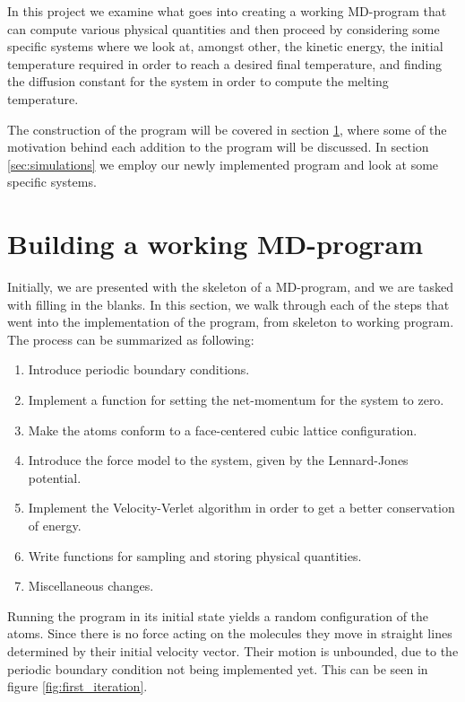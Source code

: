\documentclass[a4paper]{article}
\begin{document}
    In this project we examine what goes into creating a working MD-program
    that can compute various physical quantities and then proceed by
    considering some specific systems where we look at, amongst other, the
    kinetic energy, the initial temperature required in order to reach a
    desired final temperature, and finding the diffusion constant for the
    system in order to compute the melting temperature.

    The construction of the program will be covered in section
    \ref{sec:building_a_working_md_program}, where some of the motivation
    behind each addition to the program will be discussed. In section
    \ref{sec:simulations} we employ our newly implemented program and look at
    some specific systems.

\section{Building a working MD-program}
\label{sec:building_a_working_md_program}
    
    Initially, we are presented with the skeleton of a MD-program, and we are
    tasked with filling in the blanks. In this section, we walk through each of
    the steps that went into the implementation of the program, from skeleton
    to working program. The process can be summarized as following:
    
    \begin{enumerate}[1)]
        \item Introduce periodic boundary conditions.
        \item Implement a function for setting the net-momentum for the system to zero.
        \item Make the atoms conform to a face-centered cubic lattice configuration.
        \item Introduce the force model to the system, given by the Lennard-Jones potential.
        \item Implement the Velocity-Verlet algorithm in order to get a better
            conservation of energy.
        \item Write functions for sampling and storing physical quantities.
        \item Miscellaneous changes.
    \end{enumerate}
    
    Running the program in its initial state yields a random configuration of
    the atoms. Since there is no force acting on the molecules they move in
    straight lines determined by their initial velocity vector. Their motion is
    unbounded, due to the periodic boundary condition not being implemented
    yet. This can be seen in figure \ref{fig:first_iteration}.
\end{document}
